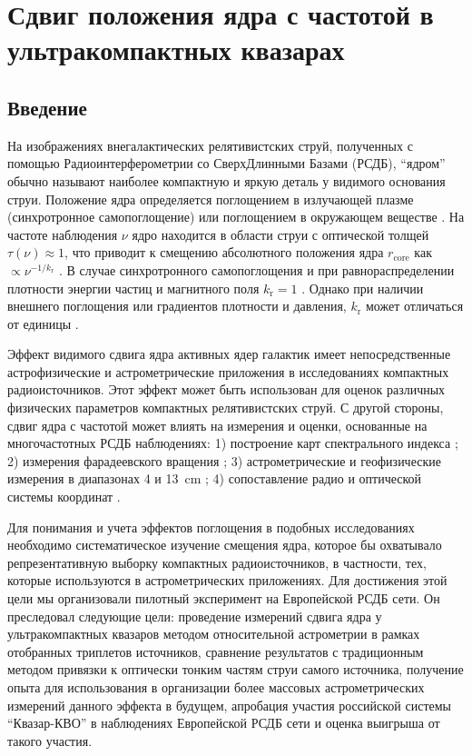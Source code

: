 \graphicspath{{Dissertation/images/chapt1/}}


\chapter{Сдвиг положения ядра с частотой в ультракомпактных квазарах} \label{chapt1}

\section{Введение}

На изображениях внегалактических релятивистских струй, полученных с помощью Радиоинтерферометрии со
СверхДлинными Базами (РСДБ), ``ядром'' обычно называют наиболее компактную и яркую деталь у видимого
основания струи. Положение ядра определяется поглощением в излучающей плазме (синхротронное
самопоглощение) или поглощением в окружающем веществе
\cite{Blandford_Konigl_1979,Konigl_1981,Lobanov_1998}. На частоте наблюдения $\nu$ ядро находится в
области струи с оптической толщей $\tau(\nu) \approx 1$, что приводит к смещению абсолютного
положения ядра $r_\mathrm{core}$ как $\propto \nu^{-1/k_{\mathrm{r}}}$ \cite{Lobanov_1998}. В случае
синхротронного самопоглощения и при равнораспределении плотности энергии частиц и магнитного поля
$k_\mathrm{r} = 1$ \cite{Blandford_Konigl_1979}. Однако при наличии внешнего поглощения или
градиентов плотности и давления, $k_\mathrm{r}$ может отличаться от единицы \cite{Lobanov_1998}.

Эффект видимого сдвига ядра активных ядер галактик имеет непосредственные астрофизические и
астрометрические приложения в исследованиях компактных радиоисточников. Этот эффект может быть
использован для оценок различных физических параметров компактных релятивистских струй. С другой
стороны, сдвиг ядра с частотой может влиять на измерения и оценки, основанные на многочастотных РСДБ
наблюдениях: 1) построение карт спектрального индекса \cite{Lobanov_1998,Kovalev_2008}; 2) измерения
фарадеевского вращения \cite{Hovatta_2012,Krav2016,Krav2017}; 3) астрометрические и геофизические
измерения в диапазонах \num{4} и \SI{13}{\cm} \cite{Ma_1998,Petrov2009}; 4) сопоставление радио и
оптической системы координат \cite{PK_letter2017,KPP2017,PK2017}.

Для понимания и учета эффектов поглощения в подобных исследованиях необходимо систематическое
изучение смещения ядра, которое бы охватывало репрезентативную выборку компактных радиоисточников, в
частности, тех, которые используются в астрометрических приложениях. Для достижения этой цели мы
организовали пилотный эксперимент на Европейской РСДБ сети. Он преследовал следующие цели:
проведение измерений сдвига ядра у ультракомпактных квазаров методом относительной астрометрии в
рамках отобранных триплетов источников, сравнение результатов с традиционным методом
привязки к оптически тонким частям струи самого источника, получение опыта для использования в
организации более массовых астрометрических измерений данного эффекта в будущем, апробация участия
российской системы ``Квазар-КВО'' в наблюдениях Европейской РСДБ сети и оценка выигрыша от такого
участия.

